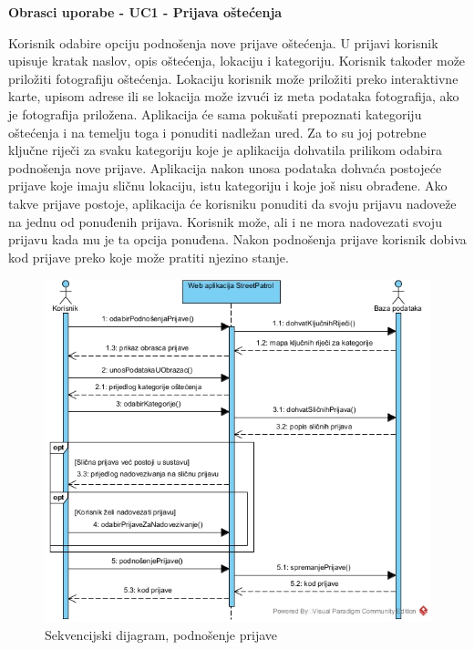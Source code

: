 				\textbf{Obrasci uporabe - UC1 - Prijava oštećenja}
				
				Korisnik odabire opciju podnošenja nove prijave oštećenja. U prijavi korisnik upisuje kratak naslov, opis oštećenja, lokaciju i kategoriju. Korisnik također može priložiti fotografiju oštećenja. Lokaciju korisnik može priložiti preko interaktivne karte, upisom adrese ili se lokacija može izvući iz meta podataka fotografija, ako je fotografija priložena. Aplikacija će sama pokušati prepoznati kategoriju oštećenja i na temelju toga i ponuditi nadležan ured. Za to su joj potrebne ključne riječi za svaku kategoriju koje je aplikacija dohvatila prilikom odabira podnošenja nove prijave. Aplikacija nakon unosa podataka dohvaća postojeće prijave koje imaju sličnu lokaciju, istu kategoriju i koje još nisu obrađene. Ako takve prijave postoje, aplikacija će korisniku ponuditi da svoju prijavu nadoveže na jednu od ponuđenih prijava. Korisnik može, ali i ne mora nadovezati svoju prijavu kada mu je ta opcija ponuđena. Nakon podnošenja prijave korisnik dobiva kod prijave preko koje može pratiti njezino stanje.
				
				\begin{figure}[H]
					\includegraphics[width=\textwidth]{slike/Podnosenje_prijaveSD.jpg} %
					\caption{Sekvencijski dijagram, podnošenje prijave}
					\label{fig:sekvencijskiDijagram2} %
				\end{figure}
				\eject
				
